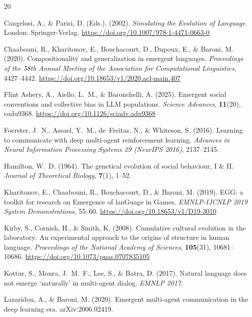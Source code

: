 \documentclass[12pt,letterpaper]{article}
\begin{document}
\begin{thebibliography}{20}
\setlength{\itemsep}{0pt}

Cangelosi, A., \& Parisi, D. (Eds.). (2002).
\emph{Simulating the Evolution of Language}.
London: Springer-Verlag.
\url{https://doi.org/10.1007/978-1-4471-0663-0}

Chaabouni, R., Kharitonov, E., Bouchacourt, D., Dupoux, E., \& Baroni, M. (2020).
Compositionality and generalization in emergent languages.
\emph{Proceedings of the 58th Annual Meeting of the Association for Computational Linguistics},
4427--4442.
\url{https://doi.org/10.18653/v1/2020.acl-main.407}

Flint Ashery, A., Aiello, L.~M., \& Baronchelli, A. (2025).
Emergent social conventions and collective bias in LLM populations.
\emph{Science Advances}, \textbf{11}(20), eadu9368.
\url{https://doi.org/10.1126/sciadv.adu9368}

Foerster, J.~N., Assael, Y.~M., de~Freitas, N., \& Whiteson, S. (2016).
Learning to communicate with deep multi-agent reinforcement learning.
\emph{Advances in Neural Information Processing Systems 29 (NeurIPS 2016)},
2137--2145.

Hamilton, W.~D. (1964).
The genetical evolution of social behaviour, I \& II.
\emph{Journal of Theoretical Biology}, \textbf{7}(1), 1--52.

Kharitonov, E., Chaabouni, R., Bouchacourt, D., \& Baroni, M. (2019).
EGG: a toolkit for research on Emergence of lanGuage in Games.
\emph{EMNLP-IJCNLP 2019 System Demonstrations}, 55--60.
\url{https://doi.org/10.18653/v1/D19-3010}

Kirby, S., Cornish, H., \& Smith, K. (2008).
Cumulative cultural evolution in the laboratory: An experimental approach to
the origins of structure in human language.
\emph{Proceedings of the National Academy of Sciences},
\textbf{105}(31), 10681--10686.
\url{https://doi.org/10.1073/pnas.0707835105}

Kottur, S., Moura, J.~M.~F., Lee, S., \& Batra, D. (2017).
Natural language does not emerge `naturally' in multi-agent dialog.
\emph{EMNLP 2017}.

Lazaridou, A., \& Baroni, M. (2020).
Emergent multi-agent communication in the deep learning era.
arXiv:2006.02419.


\end{thebibliography}
\end{document}
